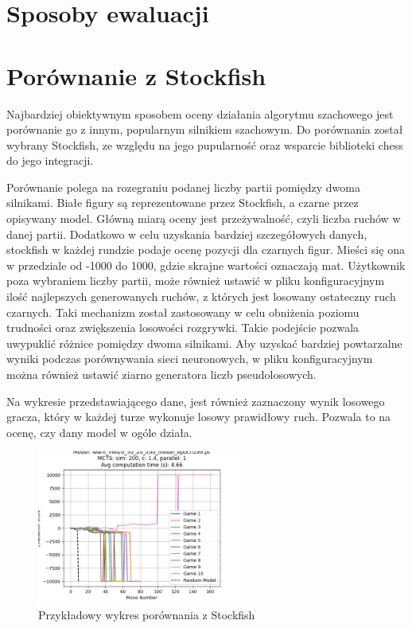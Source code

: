 \section*{Sposoby ewaluacji}

\section*{Porównanie z Stockfish}
Najbardziej obiektywnym sposobem oceny działania algorytmu szachowego jest porównanie go z innym, popularnym silnikiem szachowym. Do porównania został wybrany Stockfish, ze względu na jego pupularność oraz wsparcie biblioteki chess do jego integracji. 

Porównanie polega na rozegraniu podanej liczby partii pomiędzy dwoma silnikami. Białe figury są reprezentowane przez Stockfish, a czarne przez opisywany model. Główną miarą oceny jest przeżywalność, czyli liczba ruchów w danej partii. Dodatkowo w celu uzyskania bardziej szczegółowych danych, stockfish w każdej rundzie podaje ocenę pozycji dla czarnych figur. Mieści się ona w przedziale od -1000 do 1000, gdzie skrajne wartości oznaczają mat.
Użytkownik poza wybraniem liczby partii, może również ustawić w pliku konfiguracyjnym ilość najlepszych generowanych ruchów, z których jest losowany ostateczny ruch czarnych. Taki mechanizm został zastosowany w celu obniżenia poziomu trudności oraz zwiększenia losowości rozgrywki. Takie podejście pozwala uwypuklić różnice pomiędzy dwoma silnikami. Aby uzyskać bardziej powtarzalne wyniki podczas porównywania sieci neuronowych, w pliku konfiguracyjnym można również ustawić ziarno generatora liczb pseudolosowych.

Na wykresie przedstawiającego dane, jest również zaznaczony wynik losowego gracza, który w każdej turze wykonuje losowy prawidłowy ruch. Pozwala to na ocenę, czy dany model w ogóle działa.

\begin{figure}[h]
\centering
\includegraphics[width=0.6\textwidth]{images/eval_stock_example.png}
\caption{Przykładowy wykres porównania z Stockfish}
\end{figure}

